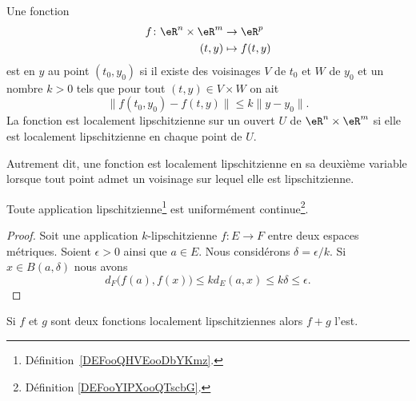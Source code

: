 \begin{definition}      \label{DefJSFFooEOCogV}
	Une fonction
	\begin{equation}
		\begin{aligned}
			f\colon \eR^n\times \eR^m & \to \eR^p      \\
			(t,y)                     & \mapsto f(t,y)
		\end{aligned}
	\end{equation}
	est  en \( y\) au point \( (t_0,y_0)\) si il existe des voisinages \( V\) de \( t_0\) et \( W\) de \( y_0\) et un nombre \( k>0\) tels que pour tout \( (t,y)\in V\times W\) on ait
	\begin{equation}
		\big\| f(t_0,y_0)-f(t,y) \big\|\leq k\| y-y_0 \|.
	\end{equation}
	La fonction est localement lipschitzienne sur un ouvert \( U\) de \( \eR^n\times \eR^m\) si elle est localement lipschitzienne en chaque point de \( U\).
\end{definition}

\begin{normaltext}      \label{NORMooYNRAooBgobcK}
	Autrement dit, une fonction est localement lipschitzienne en sa deuxième variable lorsque tout point admet un voisinage sur lequel elle est lipschitzienne.
\end{normaltext}

\begin{proposition} \label{PROPooVZSAooUneOQK}
	Toute application lipschitzienne\footnote{Définition~\ref{DEFooQHVEooDbYKmz}.} est uniformément continue\footnote{Définition \ref{DEFooYIPXooQTscbG}.}.
\end{proposition}

\begin{proof}
	Soit une application \( k\)-lipschitzienne \( f\colon E\to F\) entre deux espaces métriques. Soient \( \epsilon>0\) ainsi que \( a\in E\). Nous considérons \( \delta=\epsilon/k\). Si \( x\in B(a,\delta)\) nous avons
	\begin{equation}
		d_F\big( f(a),f(x) \big)\leq kd_E(a,x)\leq k\delta\leq \epsilon.
	\end{equation}
\end{proof}

\begin{proposition}     \label{PropGIBZooVsIqfY}
	Si \( f\) et \( g\) sont deux fonctions localement lipschitziennes alors \( f+g\) l'est.
\end{proposition}

